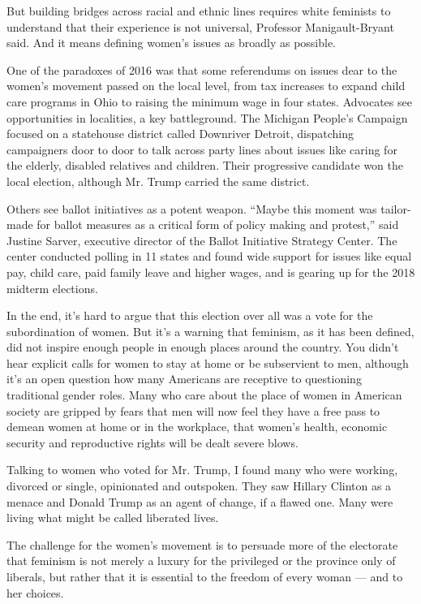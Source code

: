 But building bridges across racial and ethnic lines requires white
feminists to understand that their experience is not universal,
Professor Manigault-Bryant said. And it means defining women's issues as
broadly as possible.

One of the paradoxes of 2016 was that some referendums on issues dear to
the women's movement passed on the local level, from tax increases to
expand child care programs in Ohio to raising the minimum wage in four
states. Advocates see opportunities in localities, a key battleground.
The Michigan People's Campaign focused on a statehouse district called
Downriver Detroit, dispatching campaigners door to door to talk across
party lines about issues like caring for the elderly, disabled relatives
and children. Their progressive candidate won the local election,
although Mr. Trump carried the same district.

Others see ballot initiatives as a potent weapon. ``Maybe this moment
was tailor-made for ballot measures as a critical form of policy making
and protest,'' said Justine Sarver, executive director of the Ballot
Initiative Strategy Center. The center conducted polling in 11 states
and found wide support for issues like equal pay, child care, paid
family leave and higher wages, and is gearing up for the 2018 midterm
elections.

In the end, it's hard to argue that this election over all was a vote
for the subordination of women. But it's a warning that feminism, as it
has been defined, did not inspire enough people in enough places around
the country. You didn't hear explicit calls for women to stay at home or
be subservient to men, although it's an open question how many Americans
are receptive to questioning traditional gender roles. Many who care
about the place of women in American society are gripped by fears that
men will now feel they have a free pass to demean women at home or in
the workplace, that women's health, economic security and reproductive
rights will be dealt severe blows.

Talking to women who voted for Mr. Trump, I found many who were working,
divorced or single, opinionated and outspoken. They saw Hillary Clinton
as a menace and Donald Trump as an agent of change, if a flawed one.
Many were living what might be called liberated lives.

The challenge for the women's movement is to persuade more of the
electorate that feminism is not merely a luxury for the privileged or
the province only of liberals, but rather that it is essential to the
freedom of every woman --- and to her choices.


